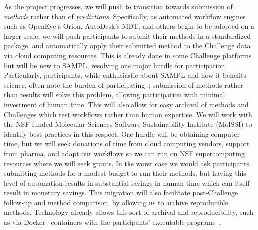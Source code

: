 \documentclass[11pt]{article}
\begin{document}
As the project progresses, we will push to transition towards submission of \emph{methods} rather than of \emph{predictions}. 
Specifically, as automated workflow engines such as OpenEye's Orion, AutoDesk's MDT, and others begin to be adopted on a larger scale, we will push participants to submit their methods in a standardized package, and automatically apply their submitted method to the Challenge data via cloud computing resources.
This is already done in some Challenge platforms~\cite{Saez-Rodriguez:2016:NatRevGenet} but will be new to SAMPL, resolving one major hurdle for participation. 
Particularly, participants, while enthusiastic about SAMPL and how it benefits science, often note the burden of participating~\cite{Mobley:2017:eScholarship}; submission of methods rather than results will solve this problem, allowing participation with minimal investment of human time.
This will also allow for easy archival of methods and Challenges which test workflows rather than human expertise.
We will work with the NSF-funded Molecular Sciences Software Sustainability Institute (MolSSI) to identify best practices in this respect. 
One hurdle will be obtaining computer time, but we will seek donations of time from cloud computing vendors, support from pharma, and adapt our workflows so we can run on NSF supercomputing resources where we will seek grants. 
In the worst case we would ask participants submitting methods for a modest budget to run their methods, but having this level of automation results in substantial savings in human time which can itself result in monetary savings. 
This migration will also facilitate post-Challenge follow-up and method comparison, by allowing us to archive reproducible methods.
Technology already allows this sort of archival and reproducibility, such as via Docker~\cite{docker_what_2015} containers with the participants' executable programs~\cite{Saez-Rodriguez:2016:NatRevGenet}.
\end{document}
